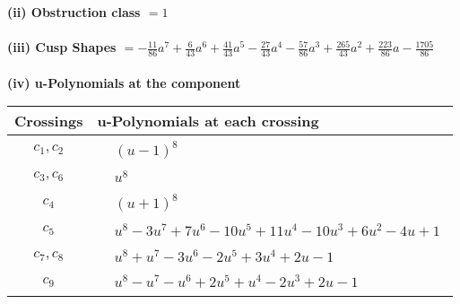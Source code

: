 \documentclass[1p]{elsarticle_modified}
\theoremstyle{definition}
\begin{document}
\flushleft \textbf{(ii) Obstruction class $= 1$}\\~\\
\flushleft \textbf{(iii) Cusp Shapes $= -\frac{11}{86} a^7+\frac{6}{43} a^6+\frac{41}{43} a^5-\frac{27}{43} a^4-\frac{57}{86} a^3+\frac{265}{43} a^2+\frac{223}{86} a-\frac{1705}{86}$}\\~\\
\newpage\renewcommand{\arraystretch}{1}
\flushleft \textbf{(iv) u-Polynomials at the component}\newline \\
\begin{tabular}{m{50pt}|m{274pt}}
Crossings & \hspace{64pt}u-Polynomials at each crossing \\
\hline $$\begin{aligned}c_{1},c_{2}\end{aligned}$$&$\begin{aligned}
&(u-1)^8
\end{aligned}$\\
\hline $$\begin{aligned}c_{3},c_{6}\end{aligned}$$&$\begin{aligned}
&u^8
\end{aligned}$\\
\hline $$\begin{aligned}c_{4}\end{aligned}$$&$\begin{aligned}
&(u+1)^8
\end{aligned}$\\
\hline $$\begin{aligned}c_{5}\end{aligned}$$&$\begin{aligned}
&u^8-3 u^7+7 u^6-10 u^5+11 u^4-10 u^3+6 u^2-4 u+1
\end{aligned}$\\
\hline $$\begin{aligned}c_{7},c_{8}\end{aligned}$$&$\begin{aligned}
&u^8+u^7-3 u^6-2 u^5+3 u^4+2 u-1
\end{aligned}$\\
\hline $$\begin{aligned}c_{9}\end{aligned}$$&$\begin{aligned}
&u^8- u^7- u^6+2 u^5+u^4-2 u^3+2 u-1
\end{aligned}$\\

\end{tabular}
\end{document}
